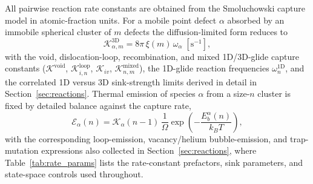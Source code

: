 All pairwise reaction rate constants are obtained from the Smoluchowski
capture model in atomic-fraction units. For a mobile point defect $\alpha$
absorbed by an immobile spherical cluster of $m$ defects the diffusion-limited
form reduces to
\begin{equation}
   \mathcal{K}^{\mathrm{3D}}_{\alpha,m}
   = 8\pi\,\xi(m)\,\omega_\alpha \;[\mathrm{s}^{-1}],
\end{equation}
with the void, dislocation-loop, recombination, and mixed 1D/3D-glide capture
constants ($\mathcal{K}^{\mathrm{void}}$, $\mathcal{K}^{\mathrm{loop}}_{i,n}$,
$\mathcal{K}_{iv}$, $\mathcal{K}^{\mathrm{mixed}}_{n,m}$), the 1D-glide reaction
frequencies $\omega^{\mathrm{1D}}_n$, and the correlated 1D versus 3D
sink-strength limits derived in detail in Section~\ref{sec:reactions}. Thermal
emission of species $\alpha$ from a size-$n$ cluster is fixed by detailed
balance against the capture rate,
\begin{equation}
   \mathcal{E}_\alpha(n)
   = \mathcal{K}_{\alpha}(n-1)\,
     \frac{1}{\Omega}\exp\!\left(-\frac{E_b^\alpha(n)}{k_BT}\right),
\end{equation}
with the corresponding loop-emission, vacancy/helium bubble-emission, and
trap-mutation expressions also collected in Section~\ref{sec:reactions}, where
Table~\ref{tab:rate_params} lists the rate-constant prefactors, sink
parameters, and state-space controls used throughout.

